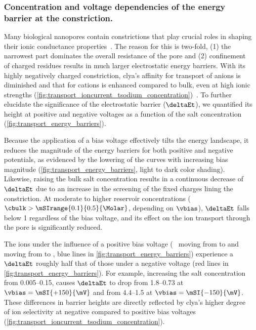 \subsubsection{Concentration and voltage dependencies of the energy barrier at the constriction.}
%

Many biological nanopores contain constrictions that play crucial roles in shaping their ionic conductance
properties~\cite{Maglia-2008,Franceschini-2016,Huang-2017}. The reason for this is two-fold, (1) the narrowest
part dominates the overall resistance of the pore and (2) confinement of charged residues results in much
larger electrostatic energy barriers. With its highly negatively charged \transi{} constriction, \gls{clya}'s
affinity for transport of anions is diminished and that for cations is enhanced compared to bulk, even at high
ionic strengths (\cref{fig:transport_ioncurrent_tsodium_concentration})~\cite{Soskine-2013}. To further
elucidate the significance of the \transi{} electrostatic barrier ($\deltaEt$), we quantified its height at
positive and negative voltages as a function of the salt concentration (\cref{fig:transport_energy_barriers}).

Because the application of a bias voltage effectively tilts the energy landscape, it reduces the magnitude of
the energy barriers for both positive and negative potentials, as evidenced by the lowering of the curves with
increasing bias magnitude (\cref{fig:transport_energy_barriers}, light to dark color shading). Likewise,
raising the bulk salt concentration results in a continuous decrease of $\deltaEt$ due to an increase in the
screening of the fixed charges lining the constriction. At moderate to higher reservoir concentrations
($\cbulk > \mSIrange{0.1}{0.5}{\Molar}$, depending on $\vbias$), $\deltaEt$ falls below \SI{1}{\kT} regardless
of the bias voltage, and its effect on the ion transport through the pore is significantly reduced.

The ions under the influence of a positive bias voltage (\ie~\Na{} moving from \transi{} to \cisi{} and \Cl{}
moving from \cisi{} to \transi{}, blue lines in \cref{fig:transport_energy_barriers}) experience a $\deltaEt$
roughly half that of those under a negative voltage (red lines in \cref{fig:transport_energy_barriers}). For
example, increasing the salt concentration from \SIrange{0.005}{0.15}{\Molar}, causes $\deltaEt$ to drop from
\SIrange{1.8}{0.73}{\kT} at $\vbias = \mSI{+150}{\mV}$ and from \SIrange{4.4}{1.5}{\kT} at $\vbias =
\mSI{-150}{\mV}$. These differences in barrier heights are directly reflected by \gls{clya}'s higher degree of
ion selectivity at negative compared to positive bias voltages
(\cref{fig:transport_ioncurrent_tsodium_concentration}). 



